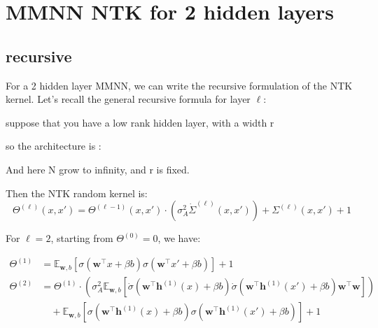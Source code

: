 \documentclass[a4paper]{article}
\begin{document}
\section{MMNN NTK for 2 hidden layers}
\subsection{recursive}
For a 2 hidden layer MMNN, we can write the recursive formulation of the NTK kernel. Let's recall the general recursive formula for layer $\ell$:

suppose that you have a low rank hidden layer, with a width r


so the architecture is :
\begin{center}
\end{center}
And here N grow to infinity, and r is fixed.

Then the NTK random kernel is:
\begin{equation}
    \Theta^{(\ell)}(x, x') = \Theta^{(\ell-1)}(x, x') \cdot \left(\sigma_A^2\dot{\Sigma}^{(\ell)}(x, x')\right) + \Sigma^{(\ell)}(x, x') +1
\end{equation}

For $\ell=2$, starting from $\Theta^{(0)} = 0$, we have:

\begin{align*}
    \Theta^{(1)} &= \mathbb{E}_{\bm{w}, b} \left[ \sigma(\bm{w}^\top x + \beta b) \sigma(\bm{w}^\top x' + \beta b) \right] + 1 \\
    \Theta^{(2)} &= \Theta^{(1)} \cdot \left(\sigma_A^2 \mathbb{E}_{\bm{w}, b} \left[ \dot{\sigma}(\bm{w}^\top \bm{h}^{(1)}(x) + \beta b) \dot{\sigma}(\bm{w}^\top \bm{h}^{(1)}(x') + \beta b) \bm{w}^\top\bm{w} \right]\right) \\
    &\quad + \mathbb{E}_{\bm{w}, b} \left[ \sigma(\bm{w}^\top \bm{h}^{(1)}(x) + \beta b) \sigma(\bm{w}^\top \bm{h}^{(1)}(x') + \beta b) \right] + 1
\end{align*}
\end{document}
